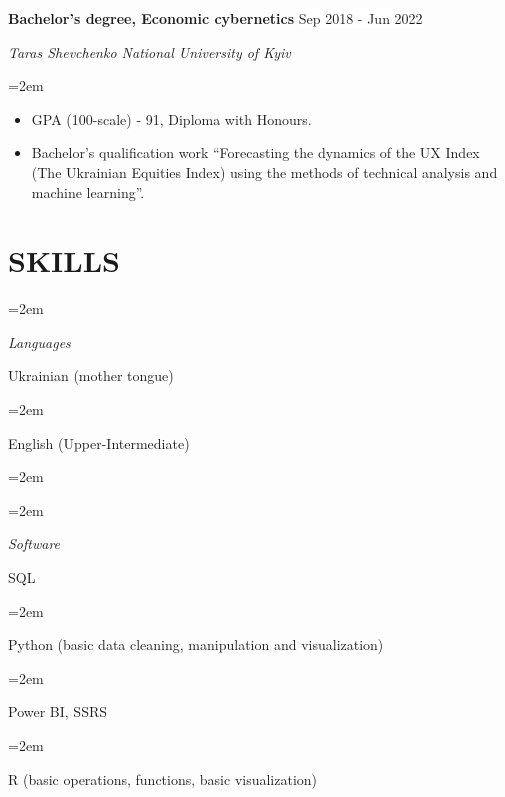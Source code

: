 \documentclass[paper=a4,fontsize=11pt]{scrartcl} %
\newlength{\spacebox}
\newcommand{\NewPart}[1]{\section*{\uppercase{#1}}}
\newcommand{\PersonalEntry}[2]{
		\noindent\hangindent=2em\hangafter=0 %
		\parbox{\spacebox}{        %
		\textit{#1}}		       %
		\hspace{1.5em} #2 \par}    %
\newcommand{\SkillsEntry}[2]{      %
		\noindent\hangindent=2em\hangafter=0 %
		\parbox{\spacebox}{        %
		\textit{#1}}			   %
		\hspace{1.5em} #2 \par}    %
\newcommand{\EducationEntry}[4]{
		\noindent \textbf{#1} \hfill      %
        \colorbox{White}{\color{Black}#2} \par  %
		\noindent \textit{#3} \par        %
		\noindent\hangindent=2em\hangafter=0 \small #4 %
		\normalsize \par}
\begin{document}
\EducationEntry{Bachelor's degree, Economic cybernetics}{Sep 2018 - Jun 2022}{Taras Shevchenko National University of Kyiv}{\begin{itemize} \setlength{\itemsep}{0pt} \item[\textcolor{white}{\textbullet}]  GPA (100-scale) - 91, Diploma with Honours. \item[\textcolor{white}{\textbullet}] Bachelor's qualification work “Forecasting the dynamics of the UX Index (The Ukrainian Equities Index) using the methods of technical analysis and machine learning”.\end{itemize}}


\NewPart{Skills}{}

\SkillsEntry{Languages}{Ukrainian (mother tongue)}
\SkillsEntry{}{English (Upper-Intermediate)}
\SkillsEntry{}{}
\SkillsEntry{Software}{SQL}
\SkillsEntry{}{Python (basic data cleaning, manipulation and visualization)}
\SkillsEntry{}{Power BI, SSRS}
\SkillsEntry{}{R (basic operations, functions, basic visualization)}
\end{document}
